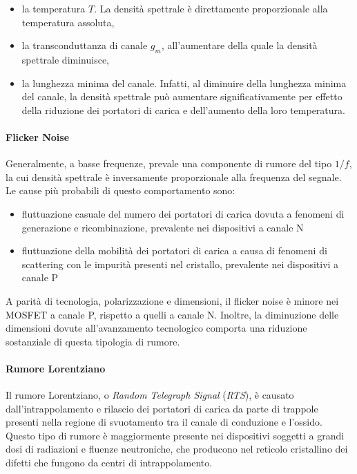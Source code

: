 \begin{itemize}
  \item la temperatura $T$. La densità spettrale è direttamente proporzionale alla temperatura assoluta,
  \item la transconduttanza di canale $g_m$, all'aumentare della quale la densità spettrale diminuisce,
  \item la lunghezza minima del canale. Infatti, al diminuire della lunghezza minima del canale, la densità spettrale può aumentare significativamente per effetto della riduzione dei portatori di carica e dell'aumento della loro temperatura.
\end{itemize}

\paragraph*{Flicker Noise}
Generalmente, a basse frequenze, prevale una componente di rumore del tipo $1/f$, la cui densità spettrale è inversamente proporzionale alla frequenza del segnale. Le cause più probabili di questo comportamento sono: 
\begin{itemize}
  \item fluttuazione casuale del numero dei portatori di carica dovuta a fenomeni di generazione e ricombinazione, prevalente nei dispositivi a canale N
  \item fluttuazione della mobilità dei portatori di carica a causa di fenomeni di scattering con le impurità presenti nel cristallo, prevalente nei dispositivi a canale P
\end{itemize}

A parità di tecnologia, polarizzazione e dimensioni, il flicker noise è minore nei MOSFET a canale P, rispetto a quelli a canale N. Inoltre, la diminuzione delle dimensioni dovute all'avanzamento tecnologico comporta una riduzione sostanziale di questa tipologia di rumore.

\paragraph*{Rumore Lorentziano}
Il rumore Lorentziano, o \emph{Random Telegraph Signal} (\emph{RTS}), è causato dall'intrappolamento e rilascio dei portatori di carica da parte di trappole presenti nella regione di svuotamento tra il canale di conduzione e l'ossido. Questo tipo di rumore è maggiormente presente nei dispositivi soggetti a grandi dosi di radiazioni e fluenze neutroniche, che producono nel reticolo cristallino dei difetti che fungono da centri di intrappolamento.

